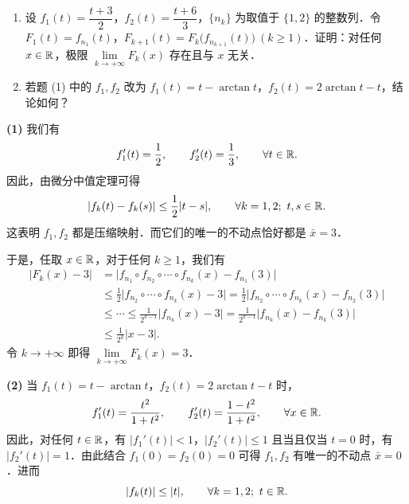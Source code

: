 \begin{enumerate}[label=(\arabic*)]
  \item 设 $f_1(t)=\dfrac{t+3}{2}$，$f_2(t)=\dfrac{t+6}{3}$，$\{n_k\}$ 为取值于 $\{1,2\}$ 的整数列．令 $F_1(t)=f_{n_1}(t)$，$F_{k+1}(t)=F_k\bigl(f_{n_{k+1}}(t)\bigr)\ (k\ge 1)$．证明：对任何 $x\in\mathbb{R}$，极限 $\lim\limits_{k\to+\infty}F_k(x)$ 存在且与 $x$ 无关．
  \item 若题 (1) 中的 $f_1,f_2$ 改为 $f_1(t)=t-\arctan t$，$f_2(t)=2\arctan t-t$，结论如何？
\end{enumerate}

\begin{solution}
\textbf{(1)} 我们有
\[
  f_1'(t)=\frac{1}{2},\qquad f_2'(t)=\frac{1}{3},\qquad \forall t\in\mathbb{R}.
\]
因此，由微分中值定理可得
\[
  |f_k(t)-f_k(s)|\le \frac{1}{2}|t-s|,\qquad \forall k=1,2;\ t,s\in\mathbb{R}.
\]
这表明 $f_1,f_2$ 都是压缩映射．而它们的唯一的不动点恰好都是 $\bar{x}=3$．

于是，任取 $x\in\mathbb{R}$，对于任何 $k\ge 1$，我们有
\begin{align*}
  |F_k(x)-3|
  &=\bigl|f_{n_1}\circ f_{n_2}\circ\cdots\circ f_{n_k}(x)-f_{n_1}(3)\bigr|\\
  &\le \frac{1}{2}\bigl|f_{n_2}\circ\cdots\circ f_{n_k}(x)-3\bigr|
   =\frac{1}{2}\bigl|f_{n_2}\circ\cdots\circ f_{n_k}(x)-f_{n_2}(3)\bigr|\\
  &\le \cdots\le \frac{1}{2^{k-1}}\bigl|f_{n_k}(x)-3\bigr|
   =\frac{1}{2^{k-1}}\bigl|f_{n_k}(x)-f_{n_k}(3)\bigr|\\
  &\le \frac{1}{2^k}|x-3|.
\end{align*}
令 $k\to+\infty$ 即得 $\lim\limits_{k\to+\infty}F_k(x)=3$．

\textbf{(2)} 当 $f_1(t)=t-\arctan t$，$f_2(t)=2\arctan t-t$ 时，
\[
  f_1'(t)=\frac{t^2}{1+t^2},\qquad f_2'(t)=\frac{1-t^2}{1+t^2},\qquad \forall x\in\mathbb{R}.
\]
因此，对任何 $t\in\mathbb{R}$，有 $|f_1'(t)|<1$，$|f_2'(t)|\le 1$ 且当且仅当 $t=0$ 时，有 $|f_2'(t)|=1$．由此结合 $f_1(0)=f_2(0)=0$ 可得 $f_1,f_2$ 有唯一的不动点 $\bar{x}=0$．进而
\[
  |f_k(t)|\le |t|,\qquad \forall k=1,2;\ t\in\R.
\]


\end{solution}
